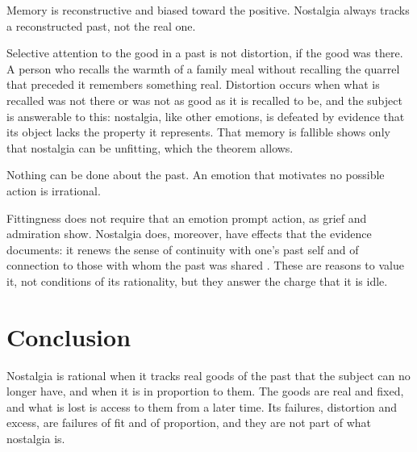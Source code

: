 \documentclass{situationist-preprint}
\begin{document}
\begin{objection}\label{o:select}
Memory is reconstructive and biased toward the positive. Nostalgia always tracks a reconstructed past, not the real one.
\end{objection}

\begin{reply}
Selective attention to the good in a past is not distortion, if the good was there. A person who recalls the warmth of a family meal without recalling the quarrel that preceded it remembers something real. Distortion occurs when what is recalled was not there or was not as good as it is recalled to be, and the subject is answerable to this: nostalgia, like other emotions, is defeated by evidence that its object lacks the property it represents. That memory is fallible shows only that nostalgia can be unfitting, which the theorem allows.
\end{reply}

\begin{objection}[Uselessness]\label{o:useless}
Nothing can be done about the past. An emotion that motivates no possible action is irrational.
\end{objection}

\begin{reply}
Fittingness does not require that an emotion prompt action, as grief and admiration show. Nostalgia does, moreover, have effects that the evidence documents: it renews the sense of continuity with one's past self and of connection to those with whom the past was shared \citep{SedikidesEtAl2008}. These are reasons to value it, not conditions of its rationality, but they answer the charge that it is idle.
\end{reply}

\section{Conclusion}

Nostalgia is rational when it tracks real goods of the past that the subject can no longer have, and when it is in proportion to them. The goods are real and fixed, and what is lost is access to them from a later time. Its failures, distortion and excess, are failures of fit and of proportion, and they are not part of what nostalgia is.
\end{document}
